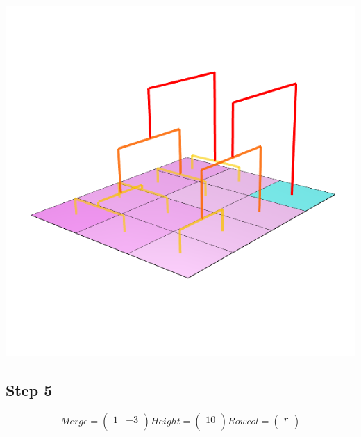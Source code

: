 \documentclass{article}
\begin{document}
\centering \includegraphics[scale=0.3]{Merge4}
\clearpage
\raggedright\subsection{Step 5}
\[
Merge =  \left(\begin{array}{cc}
1 & -3 \\
\end{array} \right)
%
Height = \left( \begin{array}{c}
10 \\
\end{array} \right)
%
Rowcol = \left( \begin{array}{c}
r \\
\end{array} \right)
\]  
\end{document}
